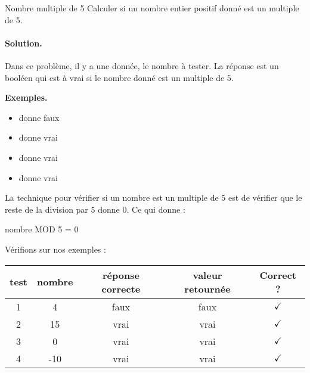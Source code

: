 			\begin{Exercice}{Nombre multiple de 5}
				\label{algo:mult5}
				Calculer si un nombre entier positif donné est un multiple de 5.
				\paragraph{Solution.}
				Dans ce problème,
				il y a une donnée, le nombre à tester.
				La réponse est un booléen
				qui est à vrai si le nombre donné est un multiple de 5.
				\begin{center}
				\end{center}
				\textbf{Exemples.}
				\begin{multicols}{4}
					\begin{itemize}
					\item {} donne faux
					\item {} donne vrai
					\item {} donne vrai
					\item {} donne vrai
					\end{itemize}
				\end{multicols}
				La technique pour vérifier si un nombre est
				un multiple de 5 est de vérifier que le reste
				de la division par 5 donne 0.
				Ce qui donne :
				\begin{LDA}[1]
						\Return nombre MOD 5 = 0
					\EndAlgo
				\end{LDA}
				Vérifions sur nos exemples :
				\begin{center}
				\begin{tabular}{|c|c|c|c|c|}
				\hline
				test \no & nombre & réponse correcte & valeur retournée & Correct ? \\\hline
				\hline 
				1 & 4   & faux & faux & {\color{ForestGreen}$\checkmark$} \\\hline
				2 & 15  & vrai & vrai & {\color{ForestGreen}$\checkmark$} \\\hline
				3 & 0   & vrai & vrai & {\color{ForestGreen}$\checkmark$} \\\hline
				4 & -10 & vrai & vrai & {\color{ForestGreen}$\checkmark$} \\\hline
				\end{tabular}
				\end{center}
			\end{Exercice}

